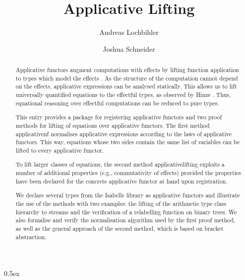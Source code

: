 \documentclass[11pt,a4paper]{article}
\begin{document}
\title{Applicative Lifting}
\author{Andreas Lochbihler \and Joshua Schneider}
\maketitle

\begin{abstract}
  Applicative functors augment computations with effects by lifting function application to types
  which model the effects \cite{mcbride08}.
  As the structure of the computation cannot depend on the effects, applicative expressions can be
  analysed statically.
  This allows us to lift universally quantified equations to the effectful types, as observed by 
  Hinze \cite{hinze10}.
  Thus, equational reasoning over effectful computations can be reduced to pure types.

  This entry provides a package for registering applicative functors and two proof methods for
  lifting of equations over applicative functors.
  The first method applicative{\isacharunderscore}nf normalises applicative expressions according to
  the laws of applicative functors.
  This way, equations whose two sides contain the same list of variables can be lifted to every
  applicative functor.

  To lift larger classes of equations, the second method applicative{\isacharunderscore}\linebreak lifting
  exploits a number of additional properties (e.g., commutativity of effects) provided the
  properties have been declared for the concrete applicative functor at hand upon registration.

  We declare several types from the Isabelle library as applicative functors and illustrate the use of
  the methods with two examples: the lifting of the arithmetic type class hierarchy to streams and
  the verification of a relabelling function on binary trees.
  We also formalise and verify the normalisation algorithm used by the first proof method,
  as well as the general approach of the second method, which is based on bracket abstraction.
\end{abstract}

\tableofcontents

\parindent 0pt\parskip 0.5ex





\end{document}

